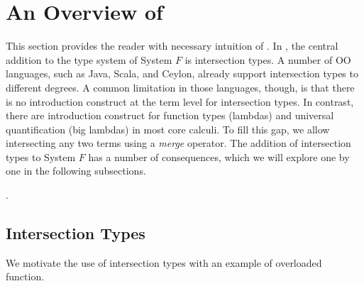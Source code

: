 \section{An Overview of \name}


This section provides the reader with necessary intuition of \name. In \name,
the central addition to the type system of System $ F $ is intersection types.
 A number of OO languages, such as Java, Scala, and
Ceylon, already support intersection types to different degrees. A
common limitation in those languages, though, is that there is no introduction
construct at the term level for intersection types. In contrast, there are
introduction construct for function types (lambdas) and universal quantification
(big lambdas) in most core calculi. To fill this gap, we allow intersecting any
two terms using a \emph{merge} operator. The addition of intersection types to
System $ F $ has a number of consequences, which we will explore one by one in
the following subsections.

. 

\subsection{Intersection Types}


We motivate the use of intersection types with an example of overloaded
function.

